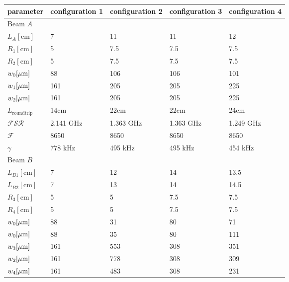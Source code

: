 \begin{table}
\scriptsize
\begin{center}
\begin{tabular}{|l|l|l|l|l|}
\hline
parameter & configuration 1 & configuration 2 & configuration 3 & configuration 4 \\
\hline
\hline
Beam $A$ & \cellcolor[gray]{0.8}   & \cellcolor[gray]{0.8} &
    \cellcolor[gray]{0.8} & \cellcolor[gray]{0.8} \\
\hline
$L_A[\mathrm{cm}]$    &  7     & 11          & 11      & 12 \\
$R_1[\mathrm{cm}]$    &  5     & 7.5         & 7.5     & 7.5 \\
$R_2[\mathrm{cm}]$    &  5     & 7.5         & 7.5     & 7.5 \\
$w_0[\mu\mathrm{m}]$         &  88    & 106         & 106     & 101 \\
$w_1[\mu\mathrm{m}]$         &  161   & 205         & 205     & 225 \\
$w_2[\mu\mathrm{m}]$         &  161   & 205         & 205     & 225 \\
$L_\mathrm{roundtrip}$ & 14cm  & 22cm        & 22cm     & 24cm \\
$\mathcal{FSR}$ & 2.141 GHz    & 1.363 GHz   & 1.363 GHz& 1.249 GHz \\
$\mathcal{F}$ & 8650           & 8650        & 8650     & 8650 \\
$\gamma$ & 778 kHz             & 495 kHz     & 495 kHz  & 454 kHz \\
\hline
Beam $B$ & \cellcolor[gray]{0.8}   & \cellcolor[gray]{0.8} &
    \cellcolor[gray]{0.8} & \cellcolor[gray]{0.8} \\
\hline
$L_{B1}[\mathrm{cm}]$ &  7        & 12        & 14     & 13.5 \\
$L_{B2}[\mathrm{cm}]$ &  7        & 13        & 14     & 14.5 \\
$R_3[\mathrm{cm}]$    &  5        & 5         & 7.5    & 7.5 \\
$R_4[\mathrm{cm}]$    &  5        & 5         & 7.5    & 7.5 \\
$w_0[\mu\mathrm{m}]$         &  88       & 31  & 80  & 71 \\
$w_0[\mu\mathrm{m}]$         &  88       & 35  & 80  & 111 \\
$w_3[\mu\mathrm{m}]$         &  161      & 553 & 308 & 351 \\
$w_2[\mu\mathrm{m}]$         &  161      & 778 & 308 & 309 \\
$w_4[\mu\mathrm{m}]$         &  161      & 483 & 308 & 231 \\

\end{tabular}
\end{center}
\end{table}
